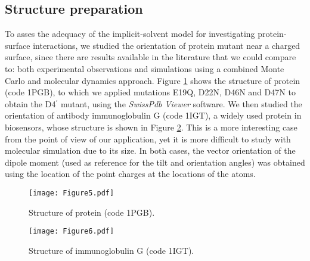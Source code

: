 \subsection{Structure preparation}

To asses the adequacy of the implicit-solvent model for investigating protein-surface interactions, we studied the orientation of protein \gb mutant near a charged surface, since there are results available in the literature that we could compare to: both experimental observations \cite{BaioWeidnerBaughGambleStaytonCastner2012} and simulations using a combined Monte Carlo and molecular dynamics approach.\cite{LiuLiaoZhou2013} Figure \ref{fig:1pgb} shows the structure of protein \gb (\pdb code {\small 1PGB}), to which we applied mutations {\small E19Q}, {\small D22N}, {\small D46N} and {\small D47N} to obtain the {\small D4$^\prime$} mutant, using the \textsl{SwissPdb Viewer} software.\cite{GuexPeitsch1997}
We then studied the orientation of antibody immunoglobulin G (\pdb code {\small 1IGT}), a widely used protein in biosensors, whose structure is shown in Figure \ref{fig:1igt}. This is a more interesting case from the point of view of our application, yet it is more difficult to study with molecular simulation due to its size.
In both cases, the vector orientation of the dipole moment (used as reference for the tilt and orientation angles) was obtained using the location of the point charges at the locations of the atoms.

\begin{figure}%
   \centering
   \texttt{[image: Figure5.pdf]}
   \caption{Structure of protein \gb (\pdb code {\small 1PGB}).}
   \label{fig:1pgb}
\end{figure}

\begin{figure}%
   \centering
   \texttt{[image: Figure6.pdf]}
   \caption{Structure of immunoglobulin G (\pdb code {\small 1IGT}).}
   \label{fig:1igt}
\end{figure}


